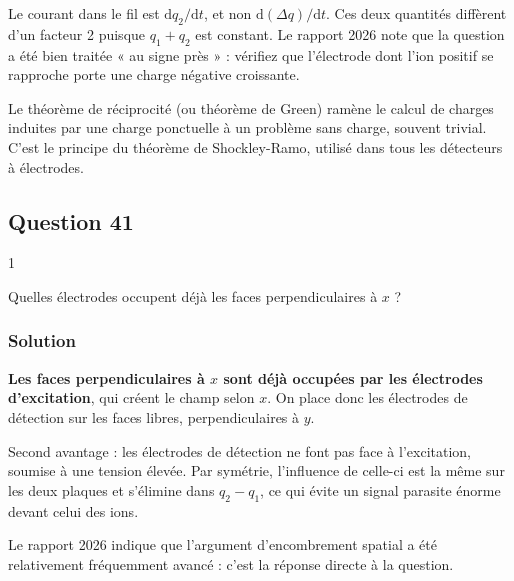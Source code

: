 \documentclass[11pt,a4paper]{article}
\begin{document}
\begin{piege}

Le courant dans le fil est \(\mathrm dq_2/\mathrm dt\), et non \(\mathrm d(\Delta q)/\mathrm dt\). Ces deux quantités diffèrent d'un facteur 2 puisque \(q_1+q_2\) est constant. Le rapport 2026 note que la question a été bien traitée « au signe près » : vérifiez que l'électrode dont l'ion positif se rapproche porte une charge négative croissante.

\end{piege}

\begin{methode}

Le théorème de réciprocité (ou théorème de Green) ramène le calcul de charges induites par une charge ponctuelle à un problème sans charge, souvent trivial. C'est le principe du théorème de Shockley-Ramo, utilisé dans tous les détecteurs à électrodes.

\end{methode}

\hypertarget{question-41}{%
\subsection{Question 41}\label{question-41}}

\begin{indication}{1}

Quelles électrodes occupent déjà les faces perpendiculaires à \(x\) ?

\end{indication}

\hypertarget{solution-40}{%
\subsubsection{Solution}\label{solution-40}}

\textbf{Les faces perpendiculaires à \(x\) sont déjà occupées par les électrodes d'excitation}, qui créent le champ selon \(x\). On place donc les électrodes de détection sur les faces libres, perpendiculaires à \(y\).

Second avantage : les électrodes de détection ne font pas face à l'excitation, soumise à une tension élevée. Par symétrie, l'influence de celle-ci est la même sur les deux plaques et s'élimine dans \(q_2-q_1\), ce qui évite un signal parasite énorme devant celui des ions.

\begin{jury}

Le rapport 2026 indique que l'argument d'encombrement spatial a été relativement fréquemment avancé : c'est la réponse directe à la question.

\end{jury}
\end{document}
